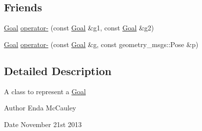 \subsection*{\-Friends}
\begin{DoxyCompactItemize}
\item 
\hyperlink{classGoal}{\-Goal} \hyperlink{classGoal_ac37c7e2fe74a4e8107fac986e06b8ec3}{operator-\/} (const \hyperlink{classGoal}{\-Goal} \&g1, const \hyperlink{classGoal}{\-Goal} \&g2)
\item 
\hyperlink{classGoal}{\-Goal} \hyperlink{classGoal_a5f7f5b02c5873dd740dd99d9fde0233f}{operator-\/} (const \hyperlink{classGoal}{\-Goal} \&g, const geometry\-\_\-msgs\-::\-Pose \&p)
\end{DoxyCompactItemize}


\subsection{\-Detailed \-Description}
\-A class to represent a \hyperlink{classGoal}{\-Goal}

\begin{DoxyAuthor}{\-Author}
\-Enda \-Mc\-Cauley 
\end{DoxyAuthor}
\begin{DoxyDate}{\-Date}
\-November 21st 2013 
\end{DoxyDate}


